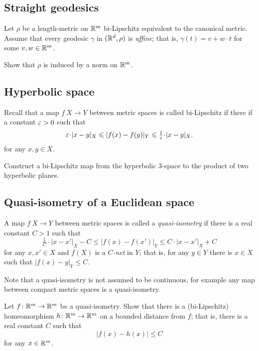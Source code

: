 \subsection*{Straight geodesics}
\label{Straight geodesics}

\begin{pr}
Let $\rho$ be a length-metric on $\mathbb{R}^m$ bi-Lipschitz equivalent to the canonical metric.
Assume that every geodesic $\gamma$ in $(\mathbb{R}^d,\rho)$ is \emph{affine};
that is, $\gamma(t)=v+w\cdot t$ for some $v,w\in\mathbb{R}^m$.

Show that $\rho$ is induced by a norm on $\mathbb{R}^m$.
\end{pr}

\subsection*{Hyperbolic space}
\label{Hyperbolic space}

Recall that a map $f\:X\to Y$ between metric spaces is called bi-Lipschitz if there if a constant $\varepsilon>0$
such that 
\[\eps\cdot|x-y|_X\le|f(x)-f(y)|_Y\le\tfrac1\eps\cdot|x-y|_X.\]
for any $x,y\in X$.


\begin{pr}
Construct a bi-Lipschitz map
from the hyperbolic $3$-space 
to the product of two hyperbolic planes.
\end{pr}

\subsection*{Quasi-isometry of a Euclidean space\thm}
\label{hom-near-QI} 

A map $f\:X\to Y$ between metric spaces is called a \emph{quasi-isometry} if there is a  real constant $C>1$ such that 
$$\tfrac{1}{C}\cdot|x-x'|_X-C
\le 
|f(x)-f(x')|_Y\le C\cdot|x-x'|_X+C$$
for any $x,x'\in X$ and $f(X)$ is a \emph{$C$-net} in $Y$;
that is, for any $y\in Y$ there is $x\in X$ such that $|f(x)-y|_Y\le C$.


Note that a quasi-isometry is not assumed to be continuous, for example any map between compact metric spaces is a quasi-isometry.

\begin{pr}
Let $f\colon\mathbb{R}^m\to\mathbb{R}^m$ be a quasi-isometry.
Show that there is a (bi-Lipschitz) homeomorphism 
$h\colon\mathbb{R}^m\to\mathbb{R}^m$ on a bounded distance from $f$;
that is, there is a real constant $C$ such that
$$|f(x)-h(x)|\le C$$
for any $x\in\mathbb{R}^m$.
\end{pr}


